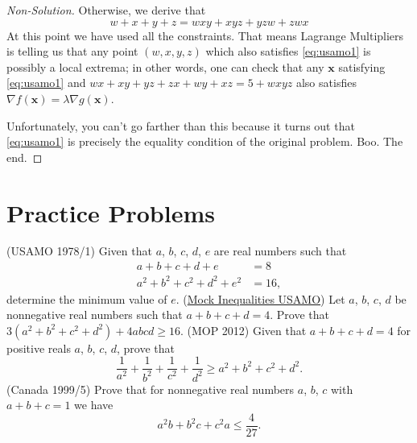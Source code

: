 \documentclass[11pt]{scrartcl}
\begin{document}
\begin{proof}[Non-Solution]
  Otherwise, we derive that
  \begin{equation}
    w+x+y+z = wxy+xyz+yzw+zwx
    \label{eq:usamo1}
  \end{equation}
  At this point we have used all the constraints.
  That means Lagrange Multipliers is telling us that any point $(w,x,y,z)$
  which also satisfies \eqref{eq:usamo1} is possibly a local extrema;
  in other words, one can check that any $\mathbf x$ satisfying \eqref{eq:usamo1}
  and $wx+xy+yz+zx+wy+xz = 5+wxyz$ also satisfies
  $\nabla f(\mathbf x) = \lambda \nabla g(\mathbf x)$.

  Unfortunately, you can't go farther than this because it turns out
  that \eqref{eq:usamo1} is precisely the equality condition of the original problem.
  Boo. The end.
\end{proof}

\section{Practice Problems}
\begin{enumerate}
  \ii (USAMO 1978/1) Given that $a$, $b$, $c$, $d$, $e$ are real numbers such that
  \begin{align*}
    a+b+c+d+e &= 8 \\
    a^2+b^2+c^2+d^2+e^2 &= 16,
  \end{align*}
  determine the minimum value of $e$.
  \ii (\href{http://www.aops.com/community/h492263}{Mock Inequalities USAMO})
  Let $a$, $b$, $c$, $d$ be nonnegative real numbers such that $a+b+c+d=4$.
  Prove that $3(a^2+b^2+c^2+d^2) + 4abcd \ge 16$.
  \ii (MOP 2012) Given that $a+b+c+d=4$ for positive reals $a$, $b$, $c$, $d$, prove that
  \[ \frac{1}{a^2} + \frac{1}{b^2} + \frac{1}{c^2} + \frac{1}{d^2}
    \ge a^2+b^2+c^2+d^2. \]
  \ii (Canada 1999/5) Prove that for nonnegative real numbers $a$, $b$, $c$
  with $a+b+c=1$ we have \[ a^2b + b^2c + c^2a \le \frac{4}{27}. \]
\end{enumerate}
\end{document}
